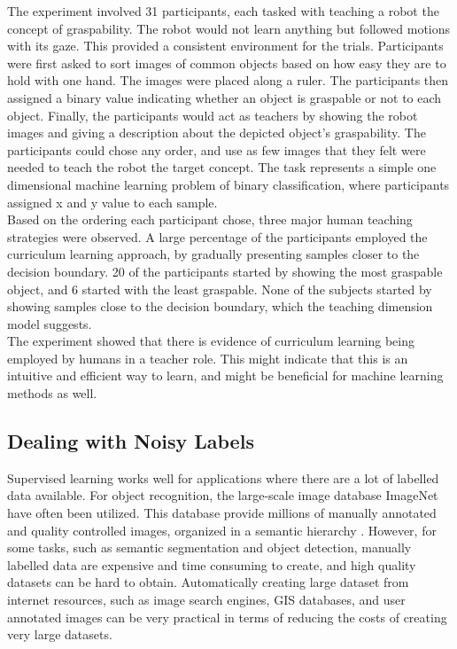 The experiment involved 31 participants, each tasked with teaching a robot the concept of graspability. The robot would not learn anything but followed motions with its gaze. This provided a consistent environment for the trials. Participants were first asked to sort images of common objects based on how easy they are to hold with one hand. The images were placed along a ruler.  The participants then assigned a binary value indicating whether an object is graspable or not to each object. Finally, the participants would act as teachers by showing the robot images and giving a description about the depicted object's graspability. The participants could chose any order, and use as few images that they felt were needed to teach the robot the target concept. The task represents a simple one dimensional machine learning problem of binary classification, where participants assigned x and y value to each sample. \\

Based on the ordering each participant chose, three major human teaching strategies were observed. A large percentage of the participants employed the curriculum learning approach, by gradually presenting samples closer to the decision boundary. 20 of the participants started by showing the most graspable object, and 6 started with the least graspable.  None of the subjects started by showing samples close to the decision boundary, which the teaching dimension model suggests.\\

The experiment showed that there is evidence of curriculum learning being employed by humans in a teacher role. This might indicate that this is an intuitive and efficient way to learn, and might be beneficial for machine learning methods as well. \\


\subsection{Dealing with Noisy Labels}
Supervised learning works well for applications where there are a lot of labelled data available. For object recognition, the large-scale image database ImageNet have often been utilized. This database provide millions of manually annotated and quality controlled images, organized in a semantic hierarchy \citep{Deng_imagenet}. However, for some tasks, such as semantic segmentation and object detection, manually labelled data are expensive and time consuming to create, and high quality datasets can be hard to obtain. Automatically creating large dataset from internet resources, such as image search engines, \ac{GIS} databases, and user annotated images can be very practical in terms of reducing the costs of creating very large datasets. \\

